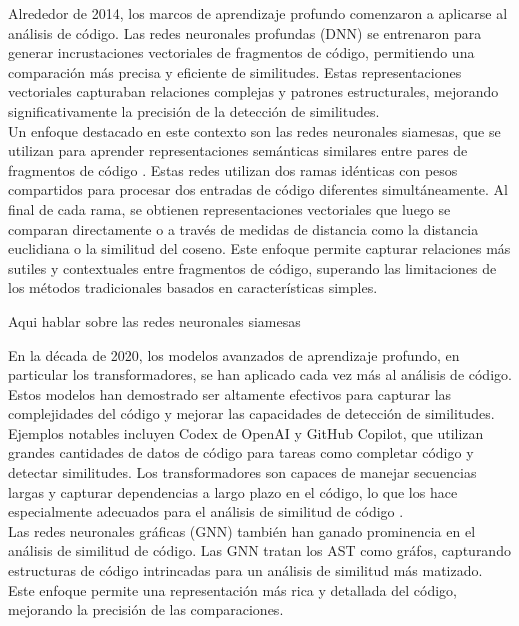 Alrededor de 2014, los marcos de aprendizaje profundo comenzaron a aplicarse al análisis de código. Las redes neuronales profundas (DNN) se entrenaron para generar incrustaciones vectoriales de fragmentos de código, permitiendo una comparación más precisa y eficiente de similitudes. Estas representaciones vectoriales capturaban relaciones complejas y patrones estructurales, mejorando significativamente la precisión de la detección de similitudes. \\

Un enfoque destacado en este contexto son las redes neuronales siamesas, que se utilizan para aprender representaciones semánticas similares entre pares de fragmentos de código \cite{smith2020enhanced}. Estas redes utilizan dos ramas idénticas con pesos compartidos para procesar dos entradas de código diferentes simultáneamente. Al final de cada rama, se obtienen representaciones vectoriales que luego se comparan directamente o a través de medidas de distancia como la distancia euclidiana o la similitud del coseno. Este enfoque permite capturar relaciones más sutiles y contextuales entre fragmentos de código, superando las limitaciones de los métodos tradicionales basados en características simples.

Aqui hablar sobre las redes neuronales siamesas

En la década de 2020, los modelos avanzados de aprendizaje profundo, en particular los transformadores, se han aplicado cada vez más al análisis de código. Estos modelos han demostrado ser altamente efectivos para capturar las complejidades del código y mejorar las capacidades de detección de similitudes. \\

Ejemplos notables incluyen Codex de OpenAI y GitHub Copilot, que utilizan grandes cantidades de datos de código para tareas como completar código y detectar similitudes. Los transformadores son capaces de manejar secuencias largas y capturar dependencias a largo plazo en el código, lo que los hace especialmente adecuados para el análisis de similitud de código \cite{vaswani2017attention}. \\

Las redes neuronales gráficas (GNN) también han ganado prominencia en el análisis de similitud de código. Las GNN tratan los AST como gráfos, capturando estructuras de código intrincadas para un análisis de similitud más matizado. Este enfoque permite una representación más rica y detallada del código, mejorando la precisión de las comparaciones.

